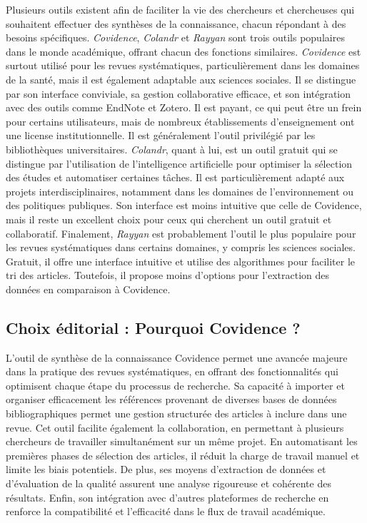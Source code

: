 \documentclass[
  letterpaper,
  DIV=11,
  numbers=noendperiod]{scrreprt}
\begin{document}
Plusieurs outils existent afin de faciliter la vie des chercheurs et
chercheuses qui souhaitent effectuer des synthèses de la connaissance,
chacun répondant à des besoins spécifiques. \emph{Covidence},
\emph{Colandr} et \emph{Rayyan} sont trois outils populaires dans le
monde académique, offrant chacun des fonctions similaires.
\emph{Covidence} est surtout utilisé pour les revues systématiques,
particulièrement dans les domaines de la santé, mais il est également
adaptable aux sciences sociales. Il se distingue par son interface
conviviale, sa gestion collaborative efficace, et son intégration avec
des outils comme EndNote et Zotero. Il est payant, ce qui peut être un
frein pour certains utilisateurs, mais de nombreux établissements
d'enseignement ont une license institutionnelle. Il est généralement
l'outil privilégié par les bibliothèques universitaires. \emph{Colandr},
quant à lui, est un outil gratuit qui se distingue par l'utilisation de
l'intelligence artificielle pour optimiser la sélection des études et
automatiser certaines tâches. Il est particulièrement adapté aux projets
interdisciplinaires, notamment dans les domaines de l'environnement ou
des politiques publiques. Son interface est moins intuitive que celle de
Covidence, mais il reste un excellent choix pour ceux qui cherchent un
outil gratuit et collaboratif. Finalement, \emph{Rayyan} est
probablement l'outil le plus populaire pour les revues systématiques
dans certains domaines, y compris les sciences sociales. Gratuit, il
offre une interface intuitive et utilise des algorithmes pour faciliter
le tri des articles. Toutefois, il propose moins d'options pour
l'extraction des données en comparaison à Covidence.

\hypertarget{choix-uxe9ditorial-pourquoi-covidence}{%
\subsection{Choix éditorial : Pourquoi Covidence
?}\label{choix-uxe9ditorial-pourquoi-covidence}}

L'outil de synthèse de la connaissance Covidence permet une avancée
majeure dans la pratique des revues systématiques, en offrant des
fonctionnalités qui optimisent chaque étape du processus de recherche.
Sa capacité à importer et organiser efficacement les références
provenant de diverses bases de données bibliographiques permet une
gestion structurée des articles à inclure dans une revue. Cet outil
facilite également la collaboration, en permettant à plusieurs
chercheurs de travailler simultanément sur un même projet. En
automatisant les premières phases de sélection des articles, il réduit
la charge de travail manuel et limite les biais potentiels. De plus, ses
moyens d'extraction de données et d'évaluation de la qualité assurent
une analyse rigoureuse et cohérente des résultats. Enfin, son
intégration avec d'autres plateformes de recherche en renforce la
compatibilité et l'efficacité dans le flux de travail académique.
\end{document}
